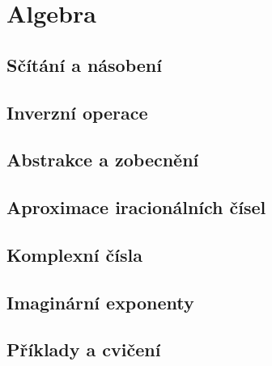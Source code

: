 \chapter{Algebra}\label{fyz:IchapXXII}
\minitoc
  \section{Sčítání a násobení}\label{fyz:IchapXXIIsecI}
  \section{Inverzní operace}\label{fyz:IchapXXIIsecII}
  \section{Abstrakce a zobecnění}\label{fyz:IchapXXIIsecIII}
  \section{Aproximace iracionálních čísel}\label{fyz:IchapXXIIsecIV}
  \section{Komplexní čísla}\label{fyz:IchapXXIIsecV}
  \section{Imaginární exponenty}\label{fyz:IchapXXIIsecVI}
  \section{Příklady a cvičení}\label{fyz:IchapXXIIsecVIII}
